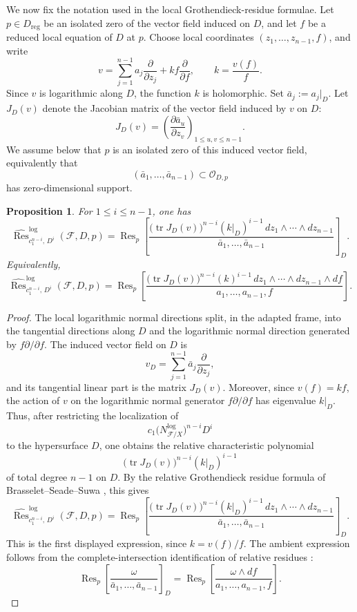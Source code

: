 \documentclass[12pt,reqno,a4paper]{amsart}
\numberwithin{equation}{section}
\theoremstyle{plain}
\newtheorem{proposition}[proposition]{Proposition}
\theoremstyle{definition}
\newcommand{\cO}{\mathcal{O}}
\newcommand{\cF}{\mathcal{F}}
\begin{document}
We now fix the notation used in the local Grothendieck-residue formulae. Let
\(p\in D_{\mathrm{reg}}\) be an isolated zero of the vector field induced on \(D\),
and let \(f\) be a reduced local equation of \(D\) at \(p\). Choose local coordinates
\((z_1,\ldots,z_{n-1},f)\), and write
\[
v=
\sum_{j=1}^{n-1}a_j\frac{\partial}{\partial z_j}
+
kf\frac{\partial}{\partial f},
\qquad k=\frac{v(f)}{f}.
\]
Since \(v\) is logarithmic along \(D\), the function \(k\) is holomorphic.
Set \(\bar a_j:=a_j|_D\). Let \(J_D(v)\) denote the Jacobian matrix of the
vector field induced by \(v\) on \(D\):
\[
J_D(v)=
\left(
\frac{\partial \bar a_u}{\partial z_v}
\right)_{1\leq u,v\leq n-1}.
\]
We assume below that \(p\) is an isolated zero of this induced vector field,
equivalently that
\[
(\bar a_1,\ldots,\bar a_{n-1})\subset \cO_{D,p}
\]
has zero-dimensional support.

\begin{proposition} 
\label{prop:hat-log-groth}
For \(1\leq i\leq n-1\), one has
\[
\widehat{\operatorname{Res}}^{\log}_{c_1^{n-i},\,D^i}(\cF,D,p)
=
\operatorname{Res}_{p}
\left[
\frac{
\bigl(\operatorname{tr}J_D(v)\bigr)^{n-i}
\left(\left. k\right|_D\right)^{i-1}
\,dz_1\wedge\cdots\wedge dz_{n-1}
}
{\bar a_1,\ldots,\bar a_{n-1}}
\right]_{D}.
\]
Equivalently,
\[
\widehat{\operatorname{Res}}^{\log}_{c_1^{n-i},\,D^i}(\cF,D,p)
=
\operatorname{Res}_{p}
\left[
\frac{
\bigl(\operatorname{tr}J_D(v)\bigr)^{n-i}
\left( k\right)^{i-1}
\,dz_1\wedge\cdots\wedge dz_{n-1}\wedge df
}
{a_1,\ldots,a_{n-1},f}
\right].
\]
\end{proposition}

\begin{proof}
The local logarithmic normal directions split, in the adapted frame, into the
tangential directions along \(D\) and the logarithmic normal direction generated by
\(f\partial/\partial f\). The induced vector field on \(D\) is
\[
v_D=\sum_{j=1}^{n-1}\bar a_j\frac{\partial}{\partial z_j},
\]
and its tangential linear part is the matrix \(J_D(v)\). Moreover, since
\(v(f)=kf\), the action of \(v\) on the logarithmic normal generator
\(f\partial/\partial f\) has eigenvalue \(k|_D\). Thus, after restricting the
localization of
\[
c_1\bigl(N_{\cF/X}^{\log}\bigr)^{n-i}D^i
\]
to the hypersurface \(D\), one obtains the relative characteristic polynomial
\[
\bigl(\operatorname{tr}J_D(v)\bigr)^{n-i}(k|_D)^{i-1}
\]
of total degree \(n-1\) on \(D\). By the relative Grothendieck residue formula of
Brasselet--Seade--Suwa \cite[\S 6.3]{BrSeSu}, this gives
\[
\widehat{\operatorname{Res}}^{\log}_{c_1^{n-i},\,D^i}(\cF,D,p)
=
\operatorname{Res}_{p}
\left[
\frac{
\bigl(\operatorname{tr}J_D(v)\bigr)^{n-i}
(k|_D)^{i-1}
\,dz_1\wedge\cdots\wedge dz_{n-1}
}
{\bar a_1,\ldots,\bar a_{n-1}}
\right]_{D}.
\]
This is the first displayed expression, since \(k=v(f)/f\). The ambient expression
follows from the complete-intersection identification of relative residues
\cite[\S 6.3]{BrSeSu}:
\[
\operatorname{Res}_{p}
\left[
\frac{\omega}{\bar a_1,\ldots,\bar a_{n-1}}
\right]_{D}
=
\operatorname{Res}_{p}
\left[
\frac{\omega\wedge df}{a_1,\ldots,a_{n-1},f}
\right].
\]
\end{proof}
\end{document}
